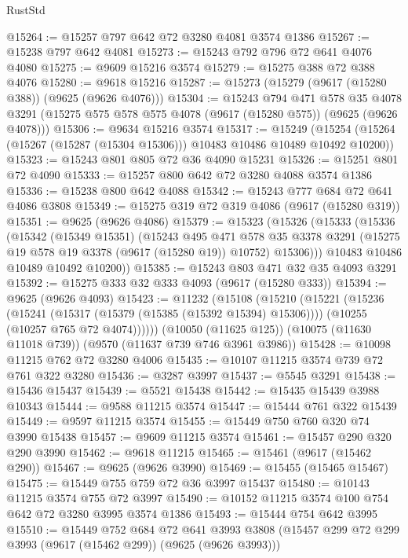 \begin{lexlean}{RustStd}
\begin{coremodule}
@15264 := @15257 @797 @642 @72 @3280 @4081 @3574 @1386
@15267 := @15238 @797 @642 @4081
@15273 := @15243 @792 @796 @72 @641 @4076 @4080
@15275 := @9609 @15216 @3574
@15279 := @15275 @388 @72 @388 @4076
@15280 := @9618 @15216
@15287 := @15273 (@15279 (@9617 (@15280 @388)) (@9625 (@9626 @4076)))
@15304 := @15243
    @794
    @471
    @578
    @35
    @4078
    @3291
    (@15275 @575 @578 @575 @4078 (@9617 (@15280 @575)) (@9625 (@9626 @4078)))
@15306 := @9634 @15216 @3574
@15317 := @15249
    (@15254 (@15264 (@15267 (@15287 (@15304 @15306))) @10483 @10486 @10489 @10492 @10200))
@15323 := @15243 @801 @805 @72 @36 @4090 @15231
@15326 := @15251 @801 @72 @4090
@15333 := @15257 @800 @642 @72 @3280 @4088 @3574 @1386
@15336 := @15238 @800 @642 @4088
@15342 := @15243 @777 @684 @72 @641 @4086 @3808
@15349 := @15275 @319 @72 @319 @4086 (@9617 (@15280 @319))
@15351 := @9625 (@9626 @4086)
@15379 := @15323
    (@15326
      (@15333
        (@15336
          (@15342
            (@15349 @15351)
            (@15243
              @495
              @471
              @578
              @35
              @3378
              @3291
              (@15275 @19 @578 @19 @3378 (@9617 (@15280 @19)) @10752)
              @15306)))
        @10483
        @10486
        @10489
        @10492
        @10200))
@15385 := @15243 @803 @471 @32 @35 @4093 @3291
@15392 := @15275 @333 @32 @333 @4093 (@9617 (@15280 @333))
@15394 := @9625 (@9626 @4093)
@15423 := @11232
    (@15108
      (@15210
        (@15221
          (@15236
            (@15241 (@15317 (@15379 (@15385 (@15392 @15394) @15306))))
            (@10255 (@10257 @765 @72 @4074))))))
    (@10050 (@11625 @125))
    (@10075 (@11630 @11018 @739))
    (@9570 (@11637 @739 @746 @3961 @3986))
@15428 := @10098 @11215 @762 @72 @3280 @4006
@15435 := @10107 @11215 @3574 @739 @72 @761 @322 @3280
@15436 := @3287 @3997
@15437 := @5545 @3291
@15438 := @15436 @15437
@15439 := @5521 @15438
@15442 := @15435 @15439 @3988 @10343
@15444 := @9588 @11215 @3574
@15447 := @15444 @761 @322 @15439
@15449 := @9597 @11215 @3574
@15455 := @15449 @750 @760 @320 @74 @3990 @15438
@15457 := @9609 @11215 @3574
@15461 := @15457 @290 @320 @290 @3990
@15462 := @9618 @11215
@15465 := @15461 (@9617 (@15462 @290))
@15467 := @9625 (@9626 @3990)
@15469 := @15455 (@15465 @15467)
@15475 := @15449 @755 @759 @72 @36 @3997 @15437
@15480 := @10143 @11215 @3574 @755 @72 @3997
@15490 := @10152 @11215 @3574 @100 @754 @642 @72 @3280 @3995 @3574 @1386
@15493 := @15444 @754 @642 @3995
@15510 := @15449
    @752
    @684
    @72
    @641
    @3993
    @3808
    (@15457 @299 @72 @299 @3993 (@9617 (@15462 @299)) (@9625 (@9626 @3993)))

\end{coremodule}
\end{lexlean}
